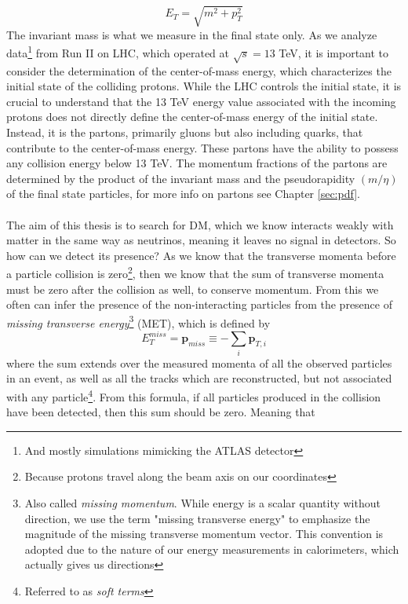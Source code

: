 \documentclass[12pt, a4paper]{book}
\begin{document}
\begin{equation}\label{eq:transverse_energy}
    E_T = \sqrt{m^2 + p_T^2}
\end{equation}
The invariant mass is what we measure in the final state only. 
As we analyze data\footnote{And mostly simulations mimicking the ATLAS detector} from Run II on LHC, which operated at $\sqrt s = 13$ TeV, it is important to consider the determination of the center-of-mass energy, which characterizes the initial state of the colliding protons. 
While the LHC controls the initial state, it is crucial to understand that the 13 TeV energy value associated with the incoming protons does not directly define the center-of-mass energy of the initial state. Instead, it is the partons, 
primarily gluons but also including quarks, that contribute to the center-of-mass energy. These partons have the ability to possess any collision energy below 13 TeV. The momentum fractions of the partons are determined by the product of 
the invariant mass and the pseudorapidity $(m/\eta)$ of the final state particles, for more info on partons see Chapter \ref{sec:pdf}.\\
\\The aim of this thesis is to search for DM, which we know interacts weakly with matter in the same way as neutrinos, meaning it leaves no signal in detectors. So how can we detect its presence? 
As we know that the transverse momenta before a particle collision is zero\footnote{Because protons travel along the beam axis on our coordinates}, then we know that the sum of transverse momenta must be zero after the collision as well, to conserve momentum.
From this we often can infer the presence of the non-interacting particles from the presence of \textit{missing transverse energy}\footnote{Also called \textit{missing momentum}. While energy is a scalar quantity without direction, we use the term "missing transverse energy" to emphasize the magnitude of the missing transverse momentum vector. This convention is adopted due to the nature of our energy measurements in calorimeters, which actually gives us directions} 
(MET), which is defined by 
\begin{equation}\label{eq:MET}
    E_T^{miss} = \mathbf{p}_{miss} \equiv -\sum_i \mathbf{p}_{T,i}
\end{equation}
where the sum extends over the measured momenta of all the observed particles in an event, as well as all the tracks which are reconstructed, but not associated with any particle\footnote{Referred to as \textit{soft terms}}. From this formula, if all particles produced in the collision have been detected, then this sum should be zero. Meaning that 
\end{document}
